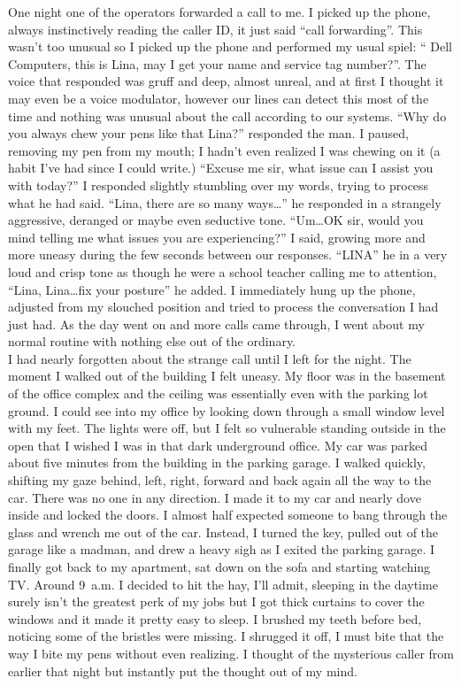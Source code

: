 \documentclass[a5paper]{scrartcl}
\begin{document}
One night one of the operators forwarded a call to me. I picked up the phone, always instinctively reading the caller ID, it just said \enquote{call forwarding}. This wasn't too unusual so I picked up the phone and performed my usual spiel: \enquote{ Dell Computers, this is Lina, may I get your name and service tag number?}. The voice that responded was gruff and deep, almost unreal, and at first I thought it may even be a voice modulator, however our lines can detect this most of the time and nothing was unusual about the call according to our systems. \enquote{Why do you always chew your pens like that Lina?} responded the man. I paused, removing my pen from my mouth; I hadn't even realized I was chewing on it (a habit I've had since I could write.) \enquote{Excuse me sir, what issue can I assist you with today?} I responded slightly stumbling over my words, trying to process what he had said. \enquote{Lina, there are so many ways\dots} he responded in a strangely aggressive, deranged or maybe even seductive tone. \enquote{Um\dots OK sir, would you mind telling me what issues you are experiencing?} I said, growing more and more uneasy during the few seconds between our responses. \enquote{LINA} he in a very loud and crisp tone as though he were a school teacher calling me to attention, \enquote{Lina, Lina\dots fix your posture} he added. I immediately hung up the phone, adjusted from my slouched position and tried to process the conversation I had just had. As the day went on and more calls came through, I went about my normal routine with nothing else out of the ordinary. \\


I had nearly forgotten about the strange call until I left for the night. The moment I walked out of the building I felt uneasy. My floor was in the basement of the office complex and the ceiling was essentially even with the parking lot ground. I could see into my office by looking down through a small window level with my feet. The lights were off, but I felt so vulnerable standing outside in the open that I wished I was in that dark underground office. My car was parked about five minutes from the building in the parking garage. I walked quickly, shifting my gaze behind, left, right, forward and back again all the way to the car. There was no one in any direction. I made it to my car and nearly dove inside and locked the doors. I almost half expected someone to bang through the glass and wrench me out of the car. Instead, I turned the key, pulled out of the garage like a madman, and drew a heavy sigh as I exited the parking garage. I finally got back to my apartment, sat down on the sofa and starting watching TV. Around 9~a.m. I decided to hit the hay, I'll admit, sleeping in the daytime surely isn't the greatest perk of my jobs but I got thick curtains to cover the windows and it made it pretty easy to sleep. I brushed my teeth before bed, noticing some of the bristles were missing. I shrugged it off, I must bite that the way I bite my pens without even realizing. I thought of the mysterious caller from earlier that night but instantly put the thought out of my mind.\\
\end{document}
